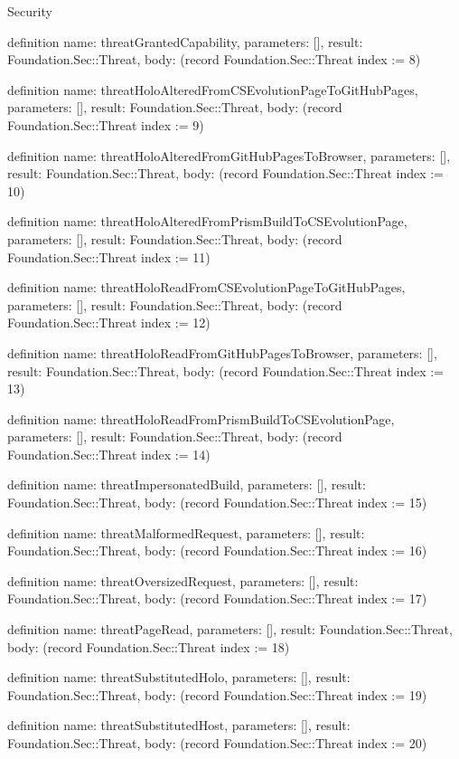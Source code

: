 \begin{lexlean}{Security}
\begin{semanticmodule}
definition{
  name: threatGrantedCapability,
  parameters: [],
  result: Foundation.Sec::Threat,
  body: (record Foundation.Sec::Threat {index := 8})
}

definition{
  name: threatHoloAlteredFromCSEvolutionPageToGitHubPages,
  parameters: [],
  result: Foundation.Sec::Threat,
  body: (record Foundation.Sec::Threat {index := 9})
}

definition{
  name: threatHoloAlteredFromGitHubPagesToBrowser,
  parameters: [],
  result: Foundation.Sec::Threat,
  body: (record Foundation.Sec::Threat {index := 10})
}

definition{
  name: threatHoloAlteredFromPrismBuildToCSEvolutionPage,
  parameters: [],
  result: Foundation.Sec::Threat,
  body: (record Foundation.Sec::Threat {index := 11})
}

definition{
  name: threatHoloReadFromCSEvolutionPageToGitHubPages,
  parameters: [],
  result: Foundation.Sec::Threat,
  body: (record Foundation.Sec::Threat {index := 12})
}

definition{
  name: threatHoloReadFromGitHubPagesToBrowser,
  parameters: [],
  result: Foundation.Sec::Threat,
  body: (record Foundation.Sec::Threat {index := 13})
}

definition{
  name: threatHoloReadFromPrismBuildToCSEvolutionPage,
  parameters: [],
  result: Foundation.Sec::Threat,
  body: (record Foundation.Sec::Threat {index := 14})
}

definition{
  name: threatImpersonatedBuild,
  parameters: [],
  result: Foundation.Sec::Threat,
  body: (record Foundation.Sec::Threat {index := 15})
}

definition{
  name: threatMalformedRequest,
  parameters: [],
  result: Foundation.Sec::Threat,
  body: (record Foundation.Sec::Threat {index := 16})
}

definition{
  name: threatOversizedRequest,
  parameters: [],
  result: Foundation.Sec::Threat,
  body: (record Foundation.Sec::Threat {index := 17})
}

definition{
  name: threatPageRead,
  parameters: [],
  result: Foundation.Sec::Threat,
  body: (record Foundation.Sec::Threat {index := 18})
}

definition{
  name: threatSubstitutedHolo,
  parameters: [],
  result: Foundation.Sec::Threat,
  body: (record Foundation.Sec::Threat {index := 19})
}

definition{
  name: threatSubstitutedHost,
  parameters: [],
  result: Foundation.Sec::Threat,
  body: (record Foundation.Sec::Threat {index := 20})
}


\end{semanticmodule}
\end{lexlean}
